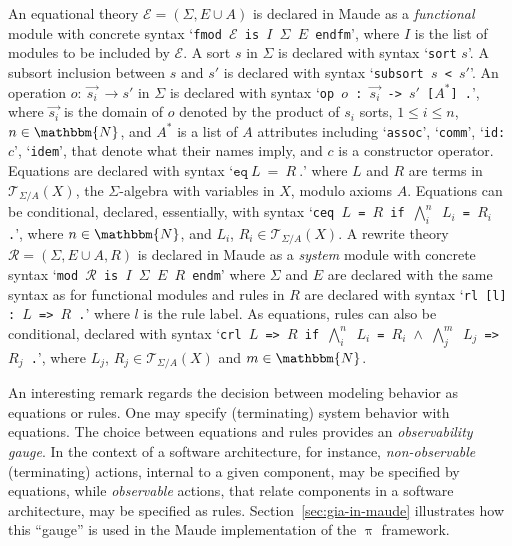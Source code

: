 \documentclass[a4paper,openany]{book}
\begin{document}
An equational theory $\mathcal{E} = (\Sigma, E \cup A)$ is declared in Maude as a \emph{functional} module with concrete syntax `\texttt{fmod  $\mathcal{E}$ is $I$ $\Sigma$ $E$ endfm}', where $I$ is the list of modules to be included by $\mathcal{E}$. A sort $s$ in $\Sigma$ is declared with syntax `\texttt{sort} $s$'. A subsort inclusion between $s$ and $s'$ is declared with syntax `\texttt{subsort $s$ < $s'$}'. An operation $o :\ \stackrel{\to}{s_i} \ \to s'$ in $\Sigma$ is declared with syntax `\texttt{op  $o$ : $\stackrel{\to}{s_i}$ -> $s'$ [$A^*$] .}', where $\stackrel{\to}{s_i}$ is the domain of $o$ denoted by the product of $s_i$ sorts, $1 \le i \le n$, $n \in \mathbbm{N}$, and $A^*$ is a list of $A$ attributes including `\texttt{assoc}', `\texttt{comm}', `\texttt{id: $c$}', `\texttt{idem}', that denote what their names imply, and $c$ is a constructor operator. Equations are declared with syntax `$\mathtt{eq} ~L~ \mathtt{=} ~R~.$' where $L$ and $R$ are terms in $\mathcal{T}_{\Sigma/A}(X)$, the $\Sigma$-algebra with variables in $X$, modulo axioms $A$. Equations can be conditional, declared, essentially, with syntax `\texttt{ceq $L$ = $R$ if $\bigwedge^n_i$ $L_i$ = $R_i$ .}', where $n \in \mathbbm{N}$, and $L_i$, $R_i \in \mathcal{T}_{\Sigma/A}(X)$. A rewrite theory $\mathcal{R} = (\Sigma, E \cup A, R)$ is declared in Maude as a \emph{system} module with concrete syntax `\texttt{mod  $\mathcal{R}$ is $I$ $\Sigma$ $E$ $R$ endm}' where $\Sigma$ and $E$ are declared with the same syntax as for functional modules and rules in $R$ are declared with syntax `\texttt{rl [l] : $L$ => $R$ .}' where $l$ is the rule label. As equations, rules can also be conditional, declared with syntax `\texttt{crl $L$ => $R$ if $\bigwedge^n_i$ $L_i$ = $R_i$ $\land$ $\bigwedge^m_j$ $L_j$ => $R_j$ .}', where $L_j$, $R_j \in \mathcal{T}_{\Sigma/A}(X)$ and $m \in \mathbbm{N}$.

An interesting remark regards the decision between modeling behavior as equations or rules.  One may specify (terminating) system behavior with equations. The choice between equations and rules provides an \emph{observability gauge}. In the context of a software architecture, for instance, \emph{non-observable} (terminating) actions, internal to a given component, may be specified by equations, while \emph{observable} actions, that relate components in a software architecture, may be specified as rules.  Section~\ref{sec:gia-in-maude} illustrates how this ``gauge'' is used in the Maude implementation of the $\uppi$ framework.  
\end{document}
